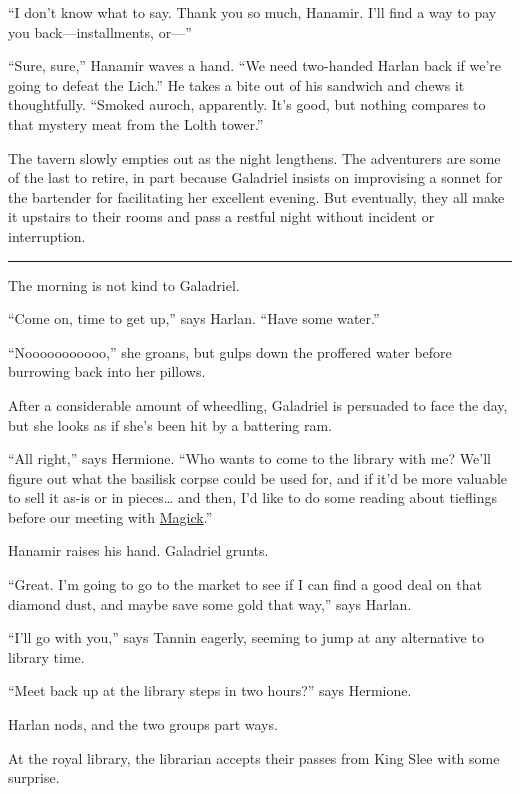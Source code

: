 \documentclass[smalldemyvopaper,11pt,twoside,onecolumn,openright,extrafontsizes]{memoir}
\begin{document}
``I don't know what to say. Thank you so much, Hanamir. I'll find a way
to pay you back---installments, or---''

``Sure, sure,'' Hanamir waves a hand. ``We need two-handed Harlan back
if we're going to defeat the Lich.'' He takes a bite out of his sandwich
and chews it thoughtfully. ``Smoked auroch, apparently. It's good, but
nothing compares to that mystery meat from the Lolth tower.''

The tavern slowly empties out as the night lengthens. The adventurers
are some of the last to retire, in part because Galadriel insists on
improvising a sonnet for the bartender for facilitating her excellent
evening. But eventually, they all make it upstairs to their rooms and
pass a restful night without incident or interruption.

\begin{center}\rule{0.5\linewidth}{\linethickness}\end{center}

The morning is not kind to Galadriel.

``Come on, time to get up,'' says Harlan. ``Have some water.''

``Nooooooooooo,'' she groans, but gulps down the proffered water before
burrowing back into her pillows.

After a considerable amount of wheedling, Galadriel is persuaded to face
the day, but she looks as if she's been hit by a battering ram.

``All right,'' says Hermione. ``Who wants to come to the library with
me? We'll figure out what the basilisk corpse could be used for, and if
it'd be more valuable to sell it as-is or in pieces\ldots{} and then,
I'd like to do some reading about tieflings before our meeting with
\href{/characters/magick/}{Magick}.''

Hanamir raises his hand. Galadriel grunts.

``Great. I'm going to go to the market to see if I can find a good deal
on that diamond dust, and maybe save some gold that way,'' says Harlan.

``I'll go with you,'' says Tannin eagerly, seeming to jump at any
alternative to library time.

``Meet back up at the library steps in two hours?'' says Hermione.

Harlan nods, and the two groups part ways.

At the royal library, the librarian accepts their passes from King Slee
with some surprise.
\end{document}
